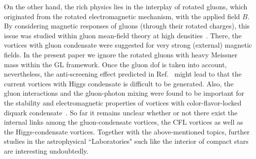 \documentclass[12pt]{article}
\begin{document}
On the other hand, the rich physics lies in the interplay of rotated gluons, which originated from the rotated electromagnetic mechanism, with the applied field $B$.
By considering magnetic responses of gluons (through their rotated charges), this issue was studied within gluon mean-field theory at high densities~\cite{ferrer2006magnetic}. 
There, the vortices with gluon condensate were suggested for very strong (external) magnetic fields.
In the present paper we ignore the rotated gluons with heavy Meissner mass within the GL framework.
Once the gluon dof is taken into account, nevertheless, the anti-screening effect predicted in Ref.~\cite{ferrer2006magnetic} might lead to that the current vortices with Higgs condensate is difficult to be generated.
Also, the gluon interactions and the gluon-photon mixing were found to be important for the stability and electromagnetic properties of vortices with color-flavor-locked diquark condensate~\cite{vinci2012spontaneous,eto2010instabilities,iida2005magnetic}.
So far it remains unclear whether or not there exist the internal links among the gluon-condensate vortices, the CFL vortices as well as the Higgs-condensate vortices. Together with the above-mentioned topics, further studies in the astrophysical ``Laboratories" such like the interior of compact stars are interesting undoubtedly. 
\end{document}
